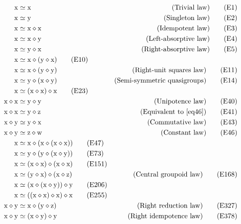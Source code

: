 \begin{align}
    \x &\formaleq \x & \hbox{(Trivial law)} \label{eq1}\tag{E1} \\
    \x &\formaleq \y & \hbox{(Singleton law)} \label{eq2}\tag{E2} \\
    \x &\formaleq \x \op \x & \hbox{(Idempotent law)} \label{eq3}\tag{E3} \\
    \x &\formaleq \x \op \y & \hbox{(Left-absorptive law)} \label{eq4}\tag{E4} \\
    \x &\formaleq \y \op \x & \hbox{(Right-absorptive law)} \label{eq5}\tag{E5} \\
    \x &\formaleq \x \op (\y \op \x) \label{eq10}\tag{E10} \\
    \x &\formaleq \x \op (\y \op \y) & \hbox{(Right-unit squares law)} \label{eq11}\tag{E11} \\
    \x &\formaleq \y \op (\x \op \y) & \hbox{(Semi-symmetric quasigroups)} \label{eq14}\tag{E14} \\
    \x &\formaleq (\x \op \x) \op \x \label{eq23}\tag{E23} \\
    \x \op \x &\formaleq \y \op \y & \hbox{(Unipotence law)} \label{eq40}\tag{E40} \\
    \x \op \x &\formaleq \y \op \z & \hbox{(Equivalent to~\eqref{eq46})} \label{eq41}\tag{E41} \\
    \x \op \y &\formaleq \y \op \x & \hbox{(Commutative law)} \label{eq43}\tag{E43} \\
    \x \op \y &\formaleq \z \op \w & \hbox{(Constant law)} \label{eq46}\tag{E46} \\
    \x &\formaleq \x \op (\x \op (\x \op \x)) \label{eq47}\tag{E47} \\
    \x &\formaleq \y \op (\y \op (\x \op \y))  \label{eq73}\tag{E73} \\
    \x &\formaleq (\x \op \x) \op (\x \op \x) \label{eq151}\tag{E151} \\
    \x &\formaleq (\y \op \x) \op (\x \op \z) & \hbox{(Central groupoid law)} \label{eq168}\tag{E168} \\
    \x &\formaleq (\x \op (\x \op \y)) \op \y \label{eq206}\tag{E206} \\
    \x &\formaleq ((\x \op \x) \op \x) \op \x \label{eq255}\tag{E255} \\
    \x \op \y &\formaleq \x \op (\y \op \z) & \hbox{(Right reduction law)} \label{eq327}\tag{E327} \\
    \x \op \y &\formaleq (\x \op \y) \op \y & \hbox{(Right idempotence law)} \label{eq378}\tag{E378} \\

\end{align}
